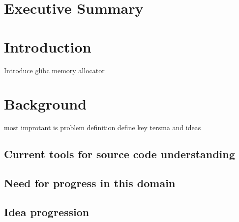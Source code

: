 
% 
%
% 
% 


\appendix %



%
%


\printbibliography[heading=bibintoc]



\section{Executive Summary}

\section{Introduction}
Introduce glibc memory allocator

\section{Background}
most improtant is problem definition 
define key tersma and ideas 

\subsection{Current tools for source code understanding}

\subsection{Need for progress in this domain}

\subsection{Idea progression}

